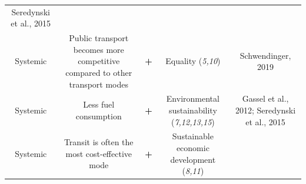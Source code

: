 \documentclass[
]{book}
\begin{document}
\begin{longtable}[]{@{}ccccc@{}}
\begin{minipage}[t]{0.17\columnwidth}
Seredynski et al., 2015\strut
\end{minipage}\tabularnewline
\begin{minipage}[t]{0.17\columnwidth}\centering
Systemic\strut
\end{minipage} & \begin{minipage}[t]{0.16\columnwidth}\centering
Public transport becomes more competitive compared to other transport modes\strut
\end{minipage} & \begin{minipage}[t]{0.17\columnwidth}\centering
\textbf{+}\strut
\end{minipage} & \begin{minipage}[t]{0.17\columnwidth}\centering
Equality (\emph{5,10})\strut
\end{minipage} & \begin{minipage}[t]{0.17\columnwidth}\centering
Schwendinger, 2019\strut
\end{minipage}\tabularnewline
\begin{minipage}[t]{0.17\columnwidth}\centering
Systemic\strut
\end{minipage} & \begin{minipage}[t]{0.16\columnwidth}\centering
Less fuel consumption\strut
\end{minipage} & \begin{minipage}[t]{0.17\columnwidth}\centering
\textbf{+}\strut
\end{minipage} & \begin{minipage}[t]{0.17\columnwidth}\centering
Environmental sustainability (\emph{7,12,13,15})\strut
\end{minipage} & \begin{minipage}[t]{0.17\columnwidth}\centering
Gassel et al., 2012; Seredynski et al., 2015\strut
\end{minipage}\tabularnewline
\begin{minipage}[t]{0.17\columnwidth}\centering
Systemic\strut
\end{minipage} & \begin{minipage}[t]{0.16\columnwidth}\centering
Transit is often the most cost-effective mode\strut
\end{minipage} & \begin{minipage}[t]{0.17\columnwidth}\centering
\textbf{+}\strut
\end{minipage} & \begin{minipage}[t]{0.17\columnwidth}\centering
Sustainable economic development (\emph{8,11})\strut
\end{minipage} & \begin{minipage}[t]{0.17\columnwidth}\centering

\end{minipage}
\end{longtable}
\end{document}
